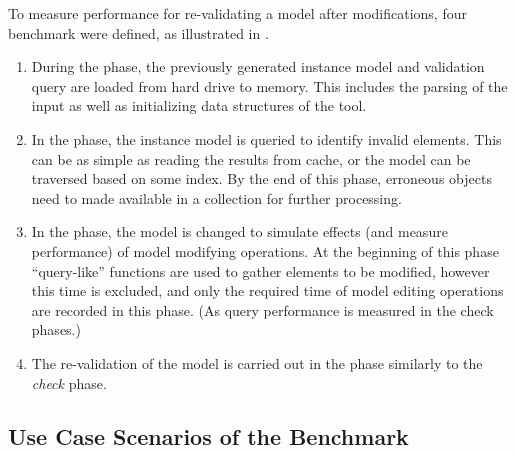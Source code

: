 To measure performance for re-validating a model after modifications, four benchmark  were defined, as illustrated in .
\begin{enumerate}
 
 \item During the  phase, the previously generated instance model and validation query are loaded from hard drive to memory. This includes the parsing of the input as well as initializing data structures of the tool.
 
 \item In the  phase, the instance model is queried to identify invalid elements. This can be as simple as reading the results from cache, or the model can be traversed based on some index. By the end of this phase, erroneous objects need to made available in a collection for further processing.
 
 \item In the  phase, the model is changed to simulate effects (and measure performance) of model modifying operations. At the beginning of this phase ``query-like'' functions are used to gather elements to be modified, however this time is excluded, and only the required time of model editing operations are recorded in this phase. (As query performance is measured in the check phases.)
 
 \item The re-validation of the model is carried out in the  phase similarly to the \emph{check} phase.
\end{enumerate}

\subsection{Use Case Scenarios of the Benchmark}
\label{sec:scenarios}

